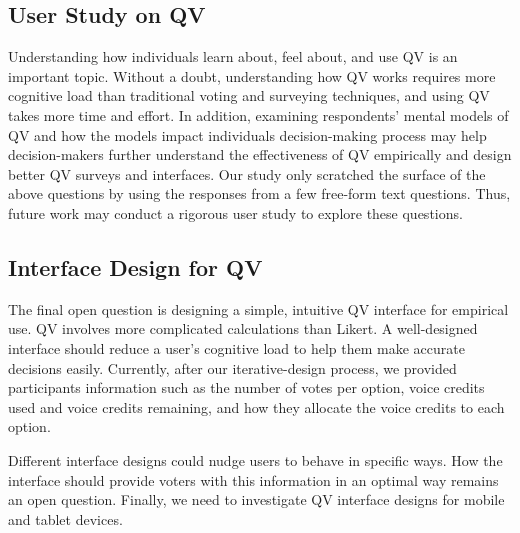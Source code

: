 \subsection{User Study on QV}
Understanding how individuals learn about, feel about, and use QV is an important topic. Without a doubt, understanding how QV works requires more cognitive load than traditional voting and surveying techniques, and using QV takes more time and effort. In addition, examining respondents' mental models of QV and how the models impact individuals decision-making process may help decision-makers further understand the effectiveness of QV empirically and design better QV surveys and interfaces. Our study only scratched the surface of the above questions by using the responses from a few free-form text questions. Thus, future work may conduct a rigorous user study to explore these questions.

\subsection{Interface Design for QV}
The final open question is designing a simple, intuitive QV interface for empirical use. QV involves more complicated calculations than Likert. A well-designed interface should reduce a user's cognitive load to help them make accurate decisions easily. Currently, after our iterative-design process, we provided participants information such as the number of votes per option, voice credits used and voice credits remaining, and how they allocate the voice credits to each option. 

Different interface designs could nudge users to behave in specific ways. How the interface should provide voters with this information in an optimal way remains an open question. Finally, we need to investigate QV interface designs for mobile and tablet devices.


